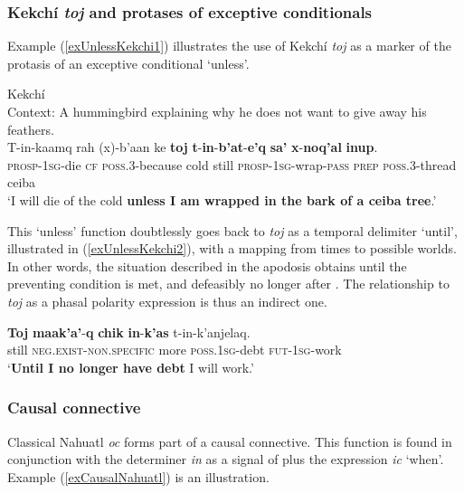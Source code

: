 \subsubsection{Kekchí \textit{toj} and protases of exceptive conditionals}
Example  (\ref{exUnlessKekchi1}) illustrates the use of Kekchí \textit{toj} as a marker of the protasis of an exceptive conditional \lq unless\rq{}.

\begin{exe}
	\ex Kekchí\\
	 Context: A hummingbird explaining why he does not want to give away his feathers.\label{exUnlessKekchi1}\\
	\gll T-in-kaamq rah (x)-b'aan ke \textbf{toj} \textbf{t}-\textbf{in}-\textbf{b'at}-\textbf{e'q} \textbf{sa'} \textbf{x}-\textbf{noq'al} \textbf{inup}.\\
	\textsc{prosp}-1\textsc{sg}-die \textsc{cf} \textsc{poss}.3-because cold still \textsc{prosp}-1\textsc{sg}-wrap-\textsc{pass} \textsc{prep} \textsc{poss}.3-thread ceiba\\
	\glt \lq I will die of the cold \textbf{unless I am wrapped in the bark of a ceiba tree}.' \parencite[467]{Kockelman2020}
\end{exe}

This \lq unless\rq{ }function doubtlessly goes back to \textit{toj} as a temporal delimiter \lq{}until\rq{}, illustrated in (\ref{exUnlessKekchi2}), with a mapping from times to possible worlds. In other words, the situation described in the apodosis obtains until the preventing condition is met, and defeasibly no longer after \parencite{Kockelman2020}. The relationship to \textit{toj} as a phasal polarity expression is thus an indirect one.

\begin{exe}
		\ex \label{exUnlessKekchi2}
		\gll \textbf{Toj} \textbf{maak’a’}-\textbf{q} \textbf{chik} \textbf{in}-\textbf{k’as} t-in-k’anjelaq.\\
		still \textsc{neg}.\textsc{exist}-\textsc{non}.\textsc{specific} more \textsc{poss}.1\textsc{sg}-debt \textsc{fut}-1\textsc{sg}-work\\
		\glt \lq \textbf{Until I no longer have debt} I will work.\rq{ }\parencite[480]{Kockelman2020}
\end{exe}

\subsubsection{Causal connective}
Classical Nahuatl \textit{oc} forms part of a causal connective. This function is found in conjunction with the determiner \textit{in} as a signal of  plus the expression \textit{ic} \lq when\rq{}. Example (\ref{exCausalNahuatl}) is an illustration.
 
